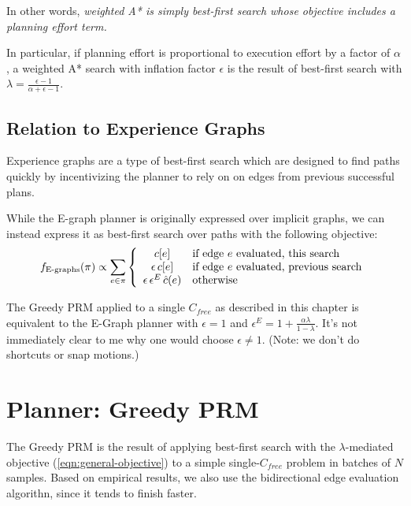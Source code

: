 \documentclass{report}
\begin{document}
In other words,
\emph{weighted A* is simply best-first search whose objective
   includes a planning effort term.}

In particular, if planning effort is proportional to execution
effort by a factor of $\alpha$,
a weighted A* search with inflation factor $\epsilon$
is the result of best-first search with
$\lambda = \frac{\epsilon-1}{\alpha+\epsilon-1}$.

\subsection{Relation to Experience Graphs}
\label{sec:egraphs}

Experience graphs \cite{phillips2012egraphs}
are a type of best-first search which
are designed to find paths quickly by incentivizing the planner
to rely on on edges from previous successful plans.

While the E-graph planner is originally expressed over implicit graphs,
we can instead express it as best-first search over paths
with the following objective:
\begin{equation}
   f_{\mbox{\scriptsize E-graphs}}(\pi) \propto \sum_{e \in \pi} \left\{
   \begin{array}{cl}
      c[e] & \mbox{if edge } e \mbox{ evaluated, this search} \\
      \epsilon \, c[e] & \mbox{if edge } e \mbox{ evaluated, previous search} \\
     \epsilon \, \epsilon^E \, \hat{c}(e) & \mbox{otherwise} \\
   \end{array}
   \right.
   \label{eqn:prop-heuristics}
\end{equation}

The Greedy PRM applied to a single $C_{free}$ as described in this chapter
is equivalent to the E-Graph planner
with $\epsilon=1$ and $\epsilon^E = 1 + \frac{\alpha \lambda}{1-\lambda}$.
It's not immediately clear to me why one would choose $\epsilon \neq 1$.
(Note: we don't do shortcuts or snap motions.)

\section{Planner: Greedy PRM}
\label{sec:greedy-prm}

The Greedy PRM is the result of applying
best-first search with the $\lambda$-mediated objective
(\ref{eqn:general-objective})
to a simple single-$C_{free}$ problem
in batches of $N$ samples.
Based on empirical results, we also use the bidirectional edge evaluation
algorithn,
since it tends to finish faster.
\end{document}
